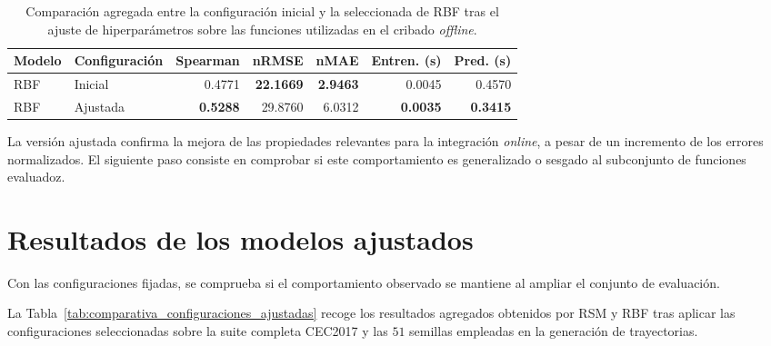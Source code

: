 \begin{table}[H]
    \centering
    \small
    \setlength{\tabcolsep}{4pt}
    \begin{adjustbox}{max width=\textwidth}
        \begin{tabular}{llrrrrr}
            \toprule
            \textbf{Modelo} & \textbf{Configuración} & \textbf{Spearman} & \textbf{nRMSE}   & \textbf{nMAE}   & \textbf{Entren. (s)} & \textbf{Pred. (s)} \\
            \midrule
            RBF             & Inicial                & 0.4771            & \textbf{22.1669} & \textbf{2.9463} & 0.0045               & 0.4570             \\
            \midrule
            RBF             & Ajustada               & \textbf{0.5288}   & 29.8760          & 6.0312          & \textbf{0.0035}      & \textbf{0.3415}    \\
            \bottomrule
        \end{tabular}
    \end{adjustbox}
    \caption[Comparación agregada entre la configuración inicial y la seleccionada de RBF tras el ajuste de hiperparámetros] {Comparación agregada entre la configuración inicial y la seleccionada de RBF tras el ajuste de hiperparámetros sobre las funciones utilizadas en el cribado \textit{offline}.}
    \label{tab:comparativa_defecto_ajustado}
\end{table}

La versión ajustada confirma la mejora de las propiedades relevantes para la integración \textit{online}, a pesar de un incremento de los errores normalizados. El siguiente paso consiste en comprobar si este comportamiento es generalizado o sesgado al subconjunto de funciones evaluadoz.

\section{Resultados de los modelos ajustados}

Con las configuraciones fijadas, se comprueba si el comportamiento observado se mantiene al ampliar el conjunto de evaluación.

La Tabla~\ref{tab:comparativa_configuraciones_ajustadas} recoge los resultados agregados obtenidos por RSM y RBF tras aplicar las configuraciones seleccionadas sobre la suite completa CEC2017 y las \(51\) semillas empleadas en la generación de trayectorias.

